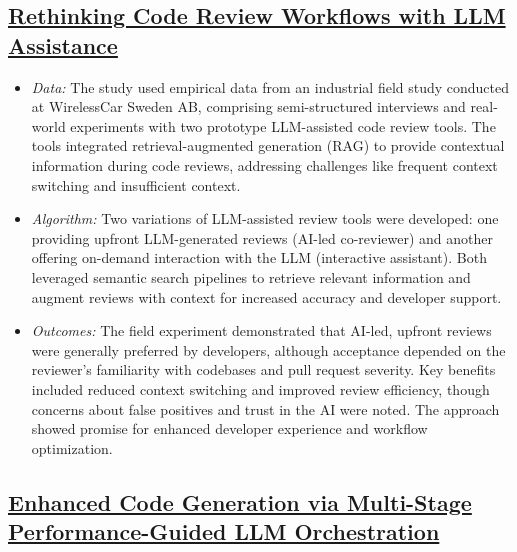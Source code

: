 \documentclass[12pt,a4paper]{article}
\begin{document}
\subsection{\href{https://arxiv.org/abs/2505.16339}{Rethinking Code Review Workflows with LLM Assistance}}

\begin{itemize}[leftmargin=1.5em]
    \item \textit{Data:} The study used empirical data from an industrial field study conducted at WirelessCar Sweden 
    AB, comprising semi-structured interviews and real-world experiments with two prototype LLM-assisted code review 
    tools. The tools integrated retrieval-augmented generation (RAG) to provide contextual information during code 
    reviews, addressing challenges like frequent context switching and insufficient context.
    \item \textit{Algorithm:} Two variations of LLM-assisted review tools were developed: one providing upfront 
    LLM-generated reviews (AI-led co-reviewer) and another offering on-demand interaction with the LLM (interactive 
    assistant). Both leveraged semantic search pipelines to retrieve relevant information and augment reviews with 
    context for increased accuracy and developer support.
    \item \textit{Outcomes:} The field experiment demonstrated that AI-led, upfront reviews were generally preferred by 
    developers, although acceptance depended on the reviewer’s familiarity with codebases and pull request severity. Key 
    benefits included reduced context switching and improved review efficiency, though concerns about false positives 
    and trust in the AI were noted. The approach showed promise for enhanced developer experience and workflow 
    optimization.
\end{itemize}

\subsection{\href{https://arxiv.org/abs/2510.01379}{Enhanced Code Generation via Multi-Stage Performance-Guided LLM 
Orchestration}}
\end{document}

